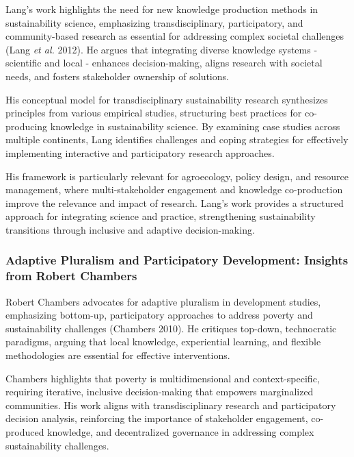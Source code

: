 \documentclass[
]{article}
\begin{document}
Lang's work highlights the need for new knowledge production methods in
sustainability science, emphasizing transdisciplinary, participatory,
and community-based research as essential for addressing complex
societal challenges (Lang \emph{et al.} 2012). He argues that
integrating diverse knowledge systems - scientific and local - enhances
decision-making, aligns research with societal needs, and fosters
stakeholder ownership of solutions.

His conceptual model for transdisciplinary sustainability research
synthesizes principles from various empirical studies, structuring best
practices for co-producing knowledge in sustainability science. By
examining case studies across multiple continents, Lang identifies
challenges and coping strategies for effectively implementing
interactive and participatory research approaches.

His framework is particularly relevant for agroecology, policy design,
and resource management, where multi-stakeholder engagement and
knowledge co-production improve the relevance and impact of research.
Lang's work provides a structured approach for integrating science and
practice, strengthening sustainability transitions through inclusive and
adaptive decision-making.

\hypertarget{adaptive-pluralism-and-participatory-development-insights-from-robert-chambers}{%
\subsubsection*{Adaptive Pluralism and Participatory Development:
Insights from Robert
Chambers}\label{adaptive-pluralism-and-participatory-development-insights-from-robert-chambers}}

Robert Chambers advocates for adaptive pluralism in development studies,
emphasizing bottom-up, participatory approaches to address poverty and
sustainability challenges (Chambers 2010). He critiques top-down,
technocratic paradigms, arguing that local knowledge, experiential
learning, and flexible methodologies are essential for effective
interventions.

Chambers highlights that poverty is multidimensional and
context-specific, requiring iterative, inclusive decision-making that
empowers marginalized communities. His work aligns with
transdisciplinary research and participatory decision analysis,
reinforcing the importance of stakeholder engagement, co-produced
knowledge, and decentralized governance in addressing complex
sustainability challenges.
\end{document}
